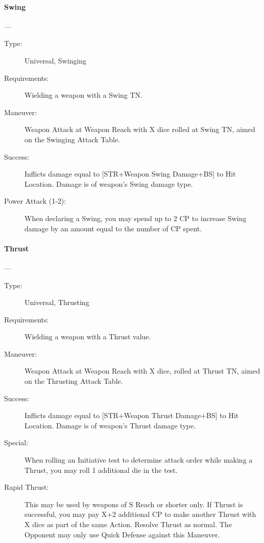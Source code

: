 \documentclass[oneside,11pt,english]{book}
\begin{document}
\paragraph{\large\label{man:Swing}Swing}---\quad{\large[X]}
\vspace{-10pt}\begin{description} 
\item [Type:] Universal, Swinging 
\item [Requirements:] Wielding a weapon with a Swing TN. 
\item [Maneuver:] Weapon Attack at Weapon Reach with X dice rolled at Swing TN, aimed on the Swinging 
  Attack Table. 
\item [Success:] Inflicts damage equal to [STR+Weapon Swing Damage+BS] to Hit Location. Damage is of 
  weapon’s Swing damage type. 
\item [Power Attack (1-2):] When declaring a Swing, you may spend up to 2 CP to increase Swing damage by 
  an amount equal to the number of CP spent. 
\end{description}
\paragraph{\large\label{man:Thrust}Thrust}---\quad{\large[X]}
\vspace{-10pt}\begin{description} 
\item [Type:] Universal, Thrusting 
\item [Requirements:] Wielding a weapon with a Thrust value. 
\item [Maneuver:] Weapon Attack at Weapon Reach with X dice, rolled at Thrust TN, aimed on the Thrusting 
  Attack Table. 
\item [Success:] Inflicts damage equal to [STR+Weapon Thrust Damage+BS] to Hit Location. Damage is of 
  weapon’s Thrust damage type. 
\item [Special:] When rolling an Initiative test to determine attack order while making a Thrust, you may roll 1 
  additional die in the test. 
\item [Rapid Thrust:] This may be used by weapons of S Reach or shorter only. If Thrust is successful, you may 
  pay X+2 additional CP to make another Thrust with X dice as part of the same Action. Resolve Thrust as 
  normal. The Opponent may only use Quick Defense against this Maneuver. 
\end{description}
\end{document}
